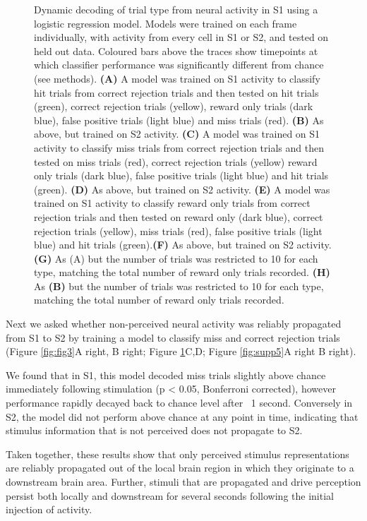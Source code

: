 \begin{figure}[h]
{Dynamic decoding of trial type from neural activity in S1 using a logistic regression model. Models were trained on each frame individually, with activity from every cell in S1 or S2, and tested on held out data. Coloured bars above the traces show timepoints at which classifier performance was significantly different from chance (see methods). \textbf{(A)} A model was trained on S1 activity to classify hit trials from correct rejection trials and then tested on hit trials (green), correct rejection trials (yellow), reward only trials (dark blue), false positive trials (light blue) and miss trials (red). \textbf{(B)} As above, but trained on S2 activity. \textbf{(C)} A model was trained on S1 activity to classify miss trials from correct rejection trials and then tested on miss trials (red), correct rejection trials (yellow) reward only trials (dark blue), false positive trials (light blue) and hit trials (green). \textbf{(D)} As above, but trained on S2 activity. \textbf{(E)} A model was trained on S1 activity to classify reward only trials from correct rejection trials and then tested on reward only (dark blue), correct rejection trials (yellow), miss trials (red), false positive trials (light blue) and hit trials (green).\textbf{(F)} As above, but trained on S2 activity. \textbf{(G)} As (A) but the number of trials was restricted to 10 for each type, matching the total number of reward only trials recorded. \textbf{(H)} As \textbf{(B)} but the number of trials was restricted to 10 for each type, matching the total number of reward only trials recorded.
} 
\label{fig:supp4}
\end{figure}

Next we asked whether non-perceived neural activity was reliably propagated from S1 to S2 by training a model to classify miss and correct rejection trials (Figure \ref{fig:fig3}A right, B right; Figure \ref{fig:supp4}C,D; Figure \ref{fig:supp5}A right B right).

We found that in S1, this model decoded miss trials slightly above chance immediately following stimulation (p < 0.05, Bonferroni corrected), however performance rapidly decayed back to chance level after ~1 second. Conversely in S2, the model did not perform above chance at any point in time, indicating that stimulus information that is not perceived does not propagate to S2.

Taken together, these results show that only perceived stimulus representations are reliably propagated out of the local brain region in which they originate to a downstream brain area. Further, stimuli that are propagated and drive perception persist both locally and downstream for several seconds following the initial injection of activity.

